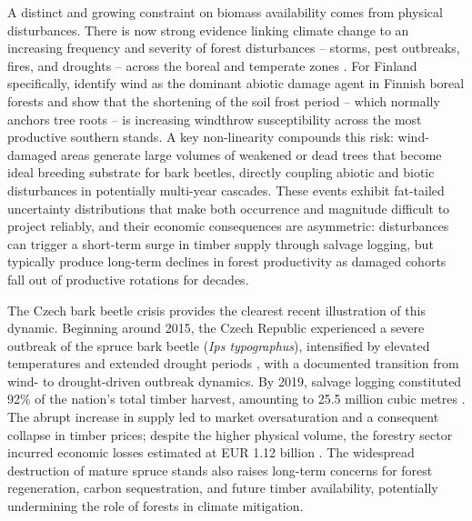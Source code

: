 \documentclass{article}
\begin{document}
A distinct and growing constraint on biomass availability comes from physical disturbances. There is now strong evidence linking climate change to an increasing frequency and severity of forest disturbances -- storms, pest outbreaks, fires, and droughts -- across the boreal and temperate zones \citep{andereggClimateRiskAnalysis2022b,lecina-diazCharacterizingForestVulnerability2021b}. For Finland specifically, \citet{venalainenClimateChangeInduces2020} identify wind as the dominant abiotic damage agent in Finnish boreal forests and show that the shortening of the soil frost period -- which normally anchors tree roots -- is increasing windthrow susceptibility across the most productive southern stands. A key non-linearity compounds this risk: wind-damaged areas generate large volumes of weakened or dead trees that become ideal breeding substrate for bark beetles, directly coupling abiotic and biotic disturbances in potentially multi-year cascades. These events exhibit fat-tailed uncertainty distributions that make both occurrence and magnitude difficult to project reliably, and their economic consequences are asymmetric: disturbances can trigger a short-term surge in timber supply through salvage logging, but typically produce long-term declines in forest productivity as damaged cohorts fall out of productive rotations for decades.

The Czech bark beetle crisis provides the clearest recent illustration of this dynamic. Beginning around 2015, the Czech Republic experienced a severe outbreak of the spruce bark beetle (\emph{Ips typographus}), intensified by elevated temperatures and extended drought periods \citep{hlasnyDevastatingOutbreakBark2021}, with a documented transition from wind- to drought-driven outbreak dynamics. By 2019, salvage logging constituted 92\% of the nation's total timber harvest, amounting to 25.5 million cubic metres \citep{simunekNorwaySpruceForest2024}. The abrupt increase in supply led to market oversaturation and a consequent collapse in timber prices; despite the higher physical volume, the forestry sector incurred economic losses estimated at EUR 1.12 billion \citep{tothImpactsCalamityLogging2020}. The widespread destruction of mature spruce stands also raises long-term concerns for forest regeneration, carbon sequestration, and future timber availability, potentially undermining the role of forests in climate mitigation.
\end{document}
